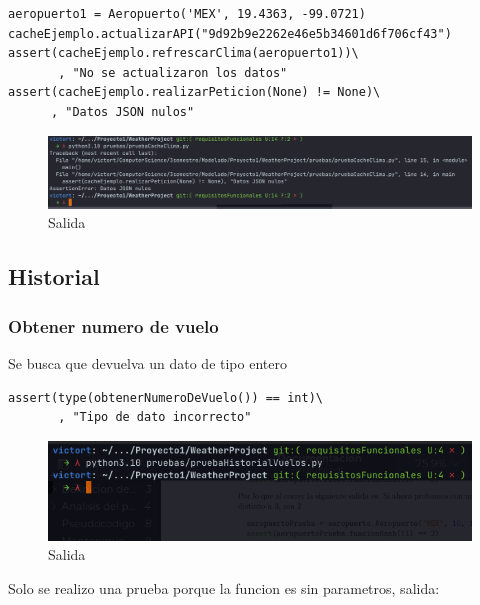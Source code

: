 \documentclass[12pt]{article}
\begin{document}
\begin{itemize}
\begin{verbatim}
aeropuerto1 = Aeropuerto('MEX', 19.4363, -99.0721)
cacheEjemplo.actualizarAPI("9d92b9e2262e46e5b34601d6f706cf43")
assert(cacheEjemplo.refrescarClima(aeropuerto1))\
       , "No se actualizaron los datos"
assert(cacheEjemplo.realizarPeticion(None) != None)\
      , "Datos JSON nulos"
\end{verbatim}
\begin{figure}[h!]
    \centering
    \includegraphics[scale=0.4]{pruebasPy/cache/pideNone.png}
    \caption{Salida}
  \end{figure}
\end{itemize}
\subsection{Historial}
\subsubsection{Obtener numero de vuelo}
Se busca que devuelva un dato de tipo entero
\begin{verbatim}
assert(type(obtenerNumeroDeVuelo()) == int)\
       , "Tipo de dato incorrecto"
\end{verbatim}
\begin{figure}[h!]
    \centering
    \includegraphics[scale=0.7]{pruebasPy/historial/bien.png}
    \caption{Salida}
  \end{figure}
Solo se realizo una prueba porque la funcion es sin parametros, salida:
\end{document}
